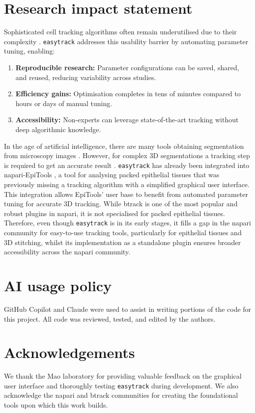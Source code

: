 \documentclass[11pt]{article}
\begin{document}
\section*{Research impact statement}
Sophisticated cell tracking algorithms often remain underutilised due to their complexity \cite{Soelistyo:2023}. \texttt{easytrack} 
addresses this usability barrier by automating parameter tuning, enabling: 
\begin{enumerate}
	\item \textbf{Reproducible research:} Parameter configurations can be saved, shared, and reused, reducing variability across 
	studies. 
	\item \textbf{Efficiency gains:} Optimisation completes in tens of minutes compared to hours or days of manual tuning. 
	\item \textbf{Accessibility:} Non-experts can leverage state-of-the-art tracking without deep algorithmic knowledge. 
\end{enumerate}
In the age of artificial intelligence, there are many tools obtaining segmentation from microscopy 
images \cite{Cellpose:2021}. However, for complex 3D segmentations a tracking step is required to get an accurate 
result \cite{Paci:2025}. \texttt{easytrack} has already been integrated into napari-EpiTools \cite{EpiTools:2025}, a tool for analysing 
packed epithelial tissues that was previously missing a tracking algorithm with a simplified graphical user interface. 
This integration allows EpiTools' user base to benefit from automated parameter tuning for accurate 3D tracking. While 
btrack is one of the most popular and robust plugins in napari, it is not specialised for packed epithelial tissues. 
Therefore, even though \texttt{easytrack} is in its early stages, it fills a gap in the napari community for easy-to-use tracking tools, particularly for epithelial tissues and 3D stitching, whilst its implementation as a standalone plugin ensures broader accessibility across the napari community. 

\section*{AI usage policy}
GitHub Copilot and Claude were used to assist in writing portions of the code for this project. All code was reviewed, tested, and edited by the authors. 

\section*{Acknowledgements}
We thank the Mao laboratory for providing valuable feedback on the graphical user interface and thoroughly testing \texttt{easytrack} during development. We also acknowledge the napari and btrack communities for creating the foundational tools upon which this work builds. 



\end{document}
